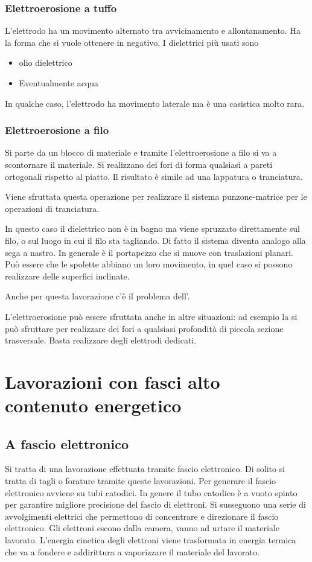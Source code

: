 \subsubsection{Elettroerosione a tuffo}
L'elettrodo ha un movimento alternato tra avvicinamento e allontanamento.
Ha la forma che si vuole ottenere in negativo.
I dielettrici più usati sono
\begin{itemize}
\item olio dielettrico
\item Eventualmente acqua
\end{itemize}
In qualche caso, l'elettrodo ha movimento laterale ma è una casistica molto rara.

\subsubsection{Elettroerosione a filo}
Si parte da un blocco di materiale e tramite l'elettroerosione a filo si va a scontornare il materiale.
Si realizzano dei fori di forma qualsiasi a pareti ortogonali rispetto al piatto. Il risultato è simile ad una lappatura o tranciatura.

Viene sfruttata questa operazione per realizzare il sistema punzone-matrice per le operazioni di tranciatura.

In questo caso il dielettrico non è in bagno ma viene spruzzato direttamente sul filo, o sul luogo in cui il filo sta tagliando.
Di fatto il sistema diventa analogo alla sega a nastro.
In generale è il portapezzo che si muove con traslazioni planari. Può essere che le spolette abbiano un loro movimento, in quel caso si possono realizzare delle superfici inclinate.

Anche per questa lavorazione c'è il problema dell'. 

L'elettroerosione può essere sfruttata anche in altre situazioni: ad esempio la si può sfruttare per realizzare dei fori a qualsiasi profondità di piccola sezione trasversale. Basta realizzare degli elettrodi dedicati.

\section{Lavorazioni con fasci alto contenuto energetico}
\subsection{A fascio elettronico}
Si tratta di una lavorazione effettuata tramite fascio elettronico.
Di solito si tratta di tagli o forature tramite queste lavorazioni.
Per generare il fascio elettronico avviene su tubi catodici.
In genere il tubo catodico è a vuoto spinto per garantire migliore precisione del fascio di elettroni.
Si susseguono una serie di avvolgimenti elettrici che permettono di concentrare e direzionare il fascio elettronico.
Gli elettroni escono dalla camera, vanno ad urtare il materiale lavorato.
L'energia cinetica degli elettroni viene trasformata in energia termica che va a fondere e addirittura a vaporizzare il materiale del lavorato.

